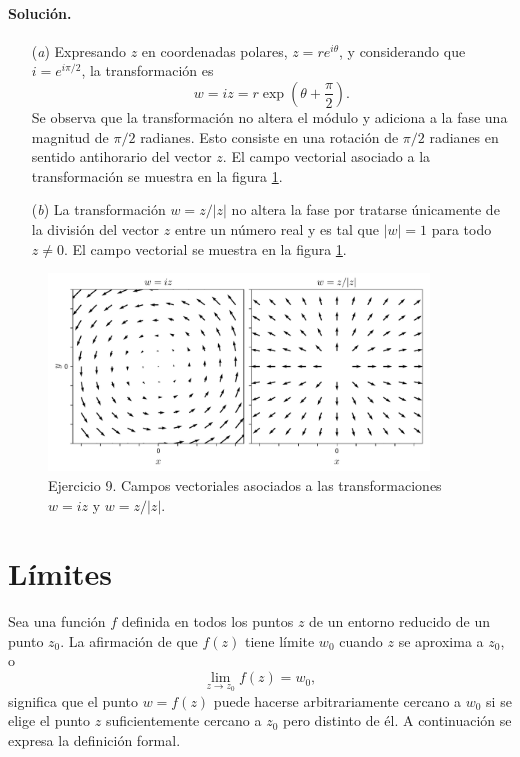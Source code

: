 \documentclass[a4paper]{report}
\begin{document}
\paragraph{Solución.}
\begin{enumerate}
 \item[(\textit{a})] Expresando \(z\) en coordenadas polares, \(z=re^{i\theta}\), y considerando que \(i=e^{i\pi/2}\), la transformación es
 \[
  w=iz=r\exp\left(\theta+\dfrac{\pi}{2}\right).
 \]
 Se observa que la transformación no altera el módulo y adiciona a la fase una magnitud de \(\pi/2\) radianes. Esto consiste en una rotación de \(\pi/2\) radianes en sentido antihorario del vector \(z\). El campo vectorial asociado a la transformación se muestra en la figura \ref{fig:exercise_14_09}.
 \item[(\textit{b})] La transformación \(w=z/|z|\) no altera la fase por tratarse únicamente de la división del vector \(z\) entre un número real y es tal que \(|w|=1\) para todo \(z\neq0\). El campo vectorial se muestra en la figura \ref{fig:exercise_14_09}.
\end{enumerate}
\begin{figure}[!htb]
 \begin{center}
 \includegraphics[width=0.9\textwidth]{figuras/exercise_14_09.pdf}
 \caption{\label{fig:exercise_14_09} Ejercicio 9. Campos vectoriales asociados a las transformaciones \(w=iz\) y \(w=z/|z|\).}
 \end{center}
\end{figure}

\section{Límites}

Sea una función \(f\) definida en todos los puntos \(z\) de un entorno reducido de un punto \(z_0\). La afirmación de que \(f(z)\) tiene límite \(w_0\) cuando \(z\) se aproxima a \(z_0\), o
\begin{equation}\label{eq:limit_statement}
 \lim_{z\to z_0}f(z)=w_0, 
\end{equation}
significa que el punto \(w=f(z)\) puede hacerse arbitrariamente cercano a \(w_0\) si se elige el punto \(z\) suficientemente cercano a \(z_0\) pero distinto de él. A continuación se expresa la definición formal.
\end{document}
